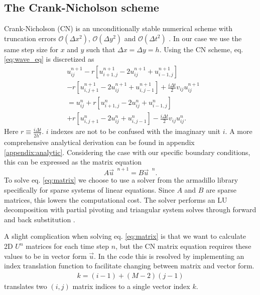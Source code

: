 \documentclass[english,notitlepage,reprint,nofootinbib]{revtex4-1}  %
\begin{document}
\subsection*{The Crank-Nicholson scheme}
Crank-Nicholson (CN) is an unconditionally stable numerical scheme with truncation errors $\mathcal{O}(\Delta x^2)$, $\mathcal{O}(\Delta y^2)$ and $\mathcal{O}(\Delta t^2)$ \cite{compendium}. In our case we use the same step size for $x$ and $y$ such that $\Delta x = \Delta y = h$. Using the CN scheme, eq. \ref{eq:wave_eq} is discretized as
\begin{align} \label{eq:CN}
     & u_{ij}^{n+1} - r \left[ u_{i+1,j}^{n+1}- 2 u_{ij}^{n+1} + u_{i-1,j}^{n+1} \right] \nonumber \\
     & - r \left[ u_{i,j+1}^{n+1}- 2 u_{ij}^{n+1} + u_{i,j-1}^{n+1} \right]
    + \frac{i \Delta t}{2} v_{ij} u_{ij}^{n+1}                                                     \\
     & = u_{ij}^n
    + r \left[ u_{i+1,j}^{n}- 2 u_{ij}^{n} + u_{i-1,j}^{n} \right] \nonumber                       \\
     & + r \left[ u_{i,j+1}^{n}- 2 u_{ij}^{n} + u_{i,j-1}^{n} \right]
    - \frac{i \Delta t}{2} v_{ij} u_{ij}^{n}. \nonumber
\end{align}
Here $r \equiv \frac{i \Delta t}{2h^2}$. $i$ indexes are not to be confused with the imaginary unit $i$. A more comprehensive analytical derivation can be found in appendix \ref{appendix:analytic}. Considering the case with our specific boundary conditions, this can be expressed as the matrix equation
\begin{equation}
    A \vec{u}^{\text{ }n+1} = B \vec{u}^{\text{ }n}. \label{eq:matrix}
\end{equation}
To solve eq. \ref{eq:matrix} we choose to use a solver from the armadillo library specifically for sparse systems of linear equations. Since $A$ and $B$ are sparse matrices, this lowers the computational cost. The solver performs an LU decomposition with partial pivoting and triangular system solves through forward and back substitution \cite{superlu_ug99}.

A slight complication when solving eq. \ref{eq:matrix} is that we want to calculate 2D $U^n$ matrices for each time step $n$, but the CN matrix equation requires these values to be in vector form $\vec{u}$. In the code this is resolved by implementing an index translation function to facilitate changing between matrix and vector form.
\begin{align*}
    k =(i - 1) + (M - 2) (j - 1)
\end{align*}
translates two $(i,j)$ matrix indices to a single vector index $k$.
\end{document}
